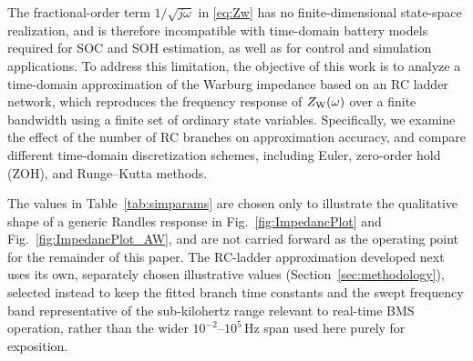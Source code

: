 \documentclass[conference]{IEEEtran}
\begin{document}
The fractional-order term $1/\sqrt{j\omega}$ in \eqref{eq:Zw} has no finite-dimensional state-space realization, and is therefore incompatible with time-domain battery models required for SOC and SOH estimation, as well as for control and simulation applications. To address this limitation, the objective of this work is to analyze a time-domain approximation of the Warburg impedance based on an RC ladder network, which reproduces the frequency response of $Z_{\rm W}(\omega)$ over a finite bandwidth using a finite set of ordinary state variables. Specifically, we examine the effect of the number of RC branches on approximation accuracy, and compare different time-domain discretization schemes, including Euler, zero-order hold (ZOH), and Runge--Kutta methods.

{\color{red}
The values in Table~\ref{tab:simparams} are chosen only to illustrate
the qualitative shape of a generic Randles response in
Fig.~\ref{fig:ImpedancPlot} and Fig.~\ref{fig:ImpedancPlot_AW}, and
are not carried forward as the operating point for the remainder of
this paper. The RC-ladder approximation developed next uses its own,
separately chosen illustrative values (Section~\ref{sec:methodology}),
selected instead to keep the fitted branch time constants and the
swept frequency band representative of the sub-kilohertz range
relevant to real-time BMS operation, rather than the wider
$10^{-2}$--$10^{5}\,\mathrm{Hz}$ span used here purely for exposition.
}


\end{document}
